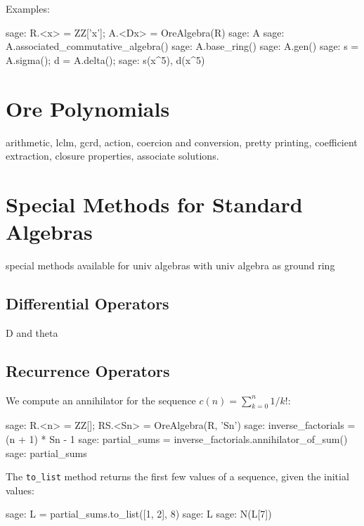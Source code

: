 \documentclass{amsart}
\begin{document}
\smallskip

Examples: 

\begin{sageexample}
  sage: R.<x> = ZZ['x']; A.<Dx> = OreAlgebra(R)
  sage: A
  sage: A.associated_commutative_algebra()
  sage: A.base_ring()
  sage: A.gen()
  sage: s = A.sigma(); d = A.delta(); 
  sage: s(x^5), d(x^5)
\end{sageexample}

\section{Ore Polynomials}\label{sec:3}

arithmetic, lclm, gcrd, action, coercion and conversion, pretty printing, 
coefficient extraction, closure properties, associate solutions. 

\section{Special Methods for Standard Algebras}\label{sec:4}

special methods available for univ algebras with univ algebra as ground ring

\subsection{Differential Operators}

D and theta

\subsection{Recurrence Operators}

We compute an annihilator for the sequence
$c(n) = \sum_{k=0}^n 1 / k!$:

\begin{sageexample}
  sage: R.<n> = ZZ[]; RS.<Sn> = OreAlgebra(R, 'Sn')
  sage: inverse_factorials = (n + 1) * Sn - 1
  sage: partial_sums = inverse_factorials.annihilator_of_sum()
  sage: partial_sums
\end{sageexample}

The \verb|to_list| method returns the first few values of a sequence,
given the initial values:

\begin{sageexample}
  sage: L = partial_sums.to_list([1, 2], 8)
  sage: L
  sage: N(L[7])
\end{sageexample}
\end{document}
